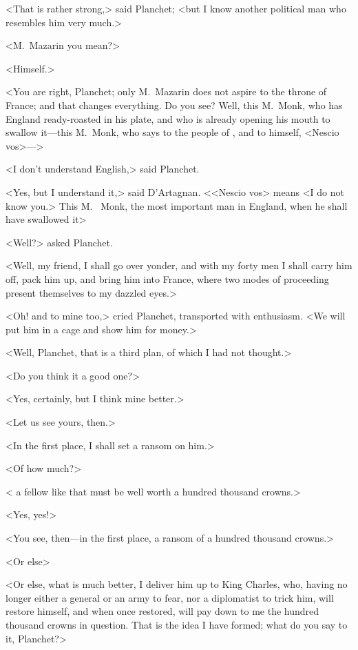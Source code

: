 <That is rather strong,> said Planchet; <but I know another political man who resembles him very much.>

<M.~Mazarin you mean?>

<Himself.>

<You are right, Planchet; only M.~Mazarin does not aspire to the throne of France; and that changes everything. Do you see? Well, this M.~Monk, who has England ready-roasted in his plate, and who is already opening his mouth to swallow it—this M.~Monk, who says to the people of , and to  himself, <Nescio vos>—>

<I don't understand English,> said Planchet.

<Yes, but I understand it,> said D'Artagnan. <<Nescio vos> means <I do not know you.> This M.~ Monk, the most important man in England, when he shall have swallowed it\longdash>

<Well?> asked Planchet.

<Well, my friend, I shall go over yonder, and with my forty men I shall carry him off, pack him up, and bring him into France, where two modes of proceeding present themselves to my dazzled eyes.>

<Oh! and to mine too,> cried Planchet, transported with enthusiasm. <We will put him in a cage and show him for money.>

<Well, Planchet, that is a third plan, of which I had not thought.>

<Do you think it a good one?>

<Yes, certainly, but I think mine better.>

<Let us see yours, then.>

<In the first place, I shall set a ransom on him.>

<Of how much?>

< a fellow like that must be well worth a hundred thousand crowns.>

<Yes, yes!>

<You see, then—in the first place, a ransom of a hundred thousand crowns.>

<Or else\longdash>

<Or else, what is much better, I deliver him up to King Charles, who, having no longer either a general or an army to fear, nor a diplomatist to trick him, will restore himself, and when once restored, will pay down to me the hundred thousand crowns in question. That is the idea I have formed; what do you say to it, Planchet?>

